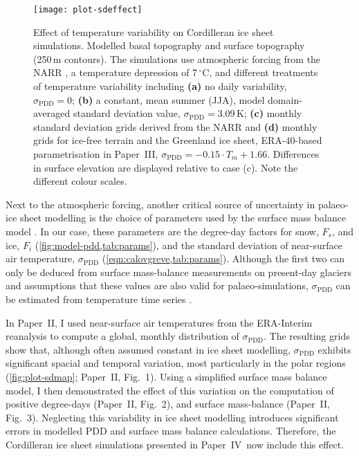 \documentclass[a4paper]{kappa}
\newcommand{\sPDD}[0]{\sigma_{\mathrm{PDD}}}
\newcommand{\unit}[1]{\ensuremath{\mathrm{#1}}}
\newcommand{\degree}[0]{\ensuremath{^{\circ}}}
\newcommand{\degC}[0]{\unit{{\degree}C}}
\newcommand{\PSDV}[0]{Paper~II}     %
\newcommand{\PSDP}[0]{Paper~III}    %
\newcommand{\CCYC}[0]{Paper~IV}     %
\begin{document}
\begin{figure}
  \texttt{[image: plot-sdeffect]}
  \caption{Effect of temperature variability on Cordilleran ice sheet
           simulations. Modelled basal topography and surface topography
           (250\,m contours). The simulations use atmospheric forcing from the
           NARR \citep{Mesinger.etal.2006}, a temperature depression of
           7\,\degC, and different treatments of temperature variability
           including
           \textbf{(a)} no daily variability, $\sPDD=0$;
           \textbf{(b)} a constant, mean summer (JJA), model domain-averaged
           standard deviation value, $\sPDD=3.09$\,K;
           \textbf{(c)} monthly standard deviation grids derived from the NARR
           and
           \textbf{(d)} monthly grids for ice-free terrain and the
           Greenland ice sheet, ERA-40-based \citep{Uppala.etal.2005}
           parametrisation in \PSDP, ${\sPDD=-0.15\cdot{T_m}+1.66}$.
           Differences in surface elevation are displayed relative to case (c).
           Note the different colour scales.}
  \label{fig:plot-sdeffect}
\end{figure}

Next to the atmospheric forcing, another critical source of uncertainty in
palaeo-ice sheet modelling is the choice of parameters used by the surface mass
balance model \citep[e.g.,][]{Hebeler.etal.2008}. In our case, these parameters
are the degree-day factors for snow, $F_s$, and ice, $F_i$
(\cref{fig:model-pdd,tab:params}), and the standard deviation of
near-surface air temperature, $\sPDD$
(\cref{eqn:calovgreve,tab:params}). Although the first two can only be
deduced from surface mass-balance measurements on present-day glaciers
\citep[e.g.,][]{Shea.etal.2009} and assumptions that these values are also
valid for palaeo-simulations, $\sPDD$ can be estimated from temperature time
series \citep[e.g.,][]{Fausto.etal.2011}.

In \PSDV, I used near-surface air temperatures from the ERA-Interim reanalysis
\citep{Dee.etal.2011} to compute a global, monthly distribution of $\sPDD$. The
resulting grids show that, although often assumed constant in ice sheet
modelling, $\sPDD$ exhibits significant spacial and temporal variation, most
particularly in the polar regions (\cref{fig:plot-sdmap}; \PSDV, Fig.~1). Using
a simplified surface mass balance model, I then demonstrated the effect of this
variation on the computation of positive degree-days (\PSDV, Fig.~2), and
surface mass-balance (\PSDV, Fig.~3). Neglecting this variability in ice sheet
modelling introduces significant errors in modelled PDD and surface mass
balance calculations. Therefore, the Cordilleran ice sheet simulations
presented in \CCYC\ now include this effect.
\end{document}
